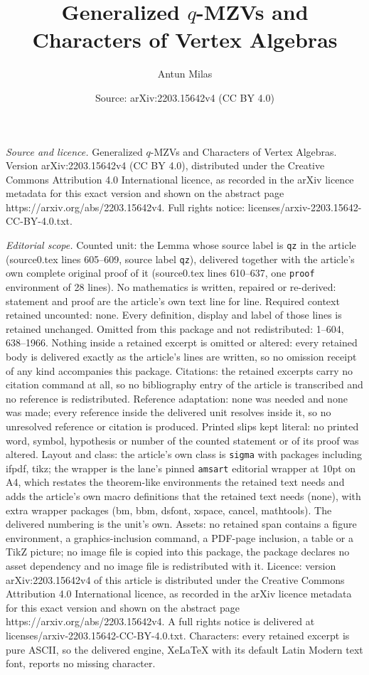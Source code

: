 \documentclass[10pt,a4paper]{amsart}
\title[Generalized $q$-MZVs and Characters of Vertex Algebras]{Generalized $q$-MZVs and Characters of Vertex Algebras}
\author{Antun Milas}
\date{Source: arXiv:2203.15642v4 (CC BY 4.0)}
\begin{document}
\maketitle

\noindent\emph{Source and licence.} Generalized $q$-MZVs and Characters of Vertex Algebras. Version arXiv:2203.15642v4 (CC BY 4.0), distributed under the Creative Commons Attribution 4.0 International licence, as recorded in the arXiv licence metadata for this exact version and shown on the abstract page https://arxiv.org/abs/2203.15642v4. Full rights notice: licenses/arxiv-2203.15642-CC-BY-4.0.txt.\par\smallskip

\noindent\textit{Editorial scope.} Counted unit: the Lemma whose source label is \texttt{qz} in the article (source0.tex lines 605--609, source label \texttt{qz}), delivered together with the article's own complete original proof of it (source0.tex lines 610--637, one \texttt{proof} environment of 28 lines). No mathematics is written, repaired or re-derived: statement and proof are the article's own text line for line. Required context retained uncounted: none. Every definition, display and label of those lines is retained unchanged. Omitted from this package and not redistributed: 1--604, 638--1966. Nothing inside a retained excerpt is omitted or altered: every retained body is delivered exactly as the article's lines are written, so no omission receipt of any kind accompanies this package. Citations: the retained excerpts carry no citation command at all, so no bibliography entry of the article is transcribed and no reference is redistributed. Reference adaptation: none was needed and none was made; every reference inside the delivered unit resolves inside it, so no unresolved reference or citation is produced. Printed slips kept literal: no printed word, symbol, hypothesis or number of the counted statement or of its proof was altered. Layout and class: the article's own class is \texttt{sigma} with packages including ifpdf, tikz; the wrapper is the lane's pinned \texttt{amsart} editorial wrapper at 10pt on A4, which restates the theorem-like environments the retained text needs and adds the article's own macro definitions that the retained text needs (none), with extra wrapper packages (bm, bbm, dsfont, xspace, cancel, mathtools). The delivered numbering is the unit's own. Assets: no retained span contains a figure environment, a graphics-inclusion command, a PDF-page inclusion, a table or a TikZ picture; no image file is copied into this package, the package declares no asset dependency and no image file is redistributed with it. Licence: version arXiv:2203.15642v4 of this article is distributed under the Creative Commons Attribution 4.0 International licence, as recorded in the arXiv licence metadata for this exact version and shown on the abstract page https://arxiv.org/abs/2203.15642v4. A full rights notice is delivered at licenses/arxiv-2203.15642-CC-BY-4.0.txt. Characters: every retained excerpt is pure ASCII, so the delivered engine, XeLaTeX with its default Latin Modern text font, reports no missing character.
\end{document}
